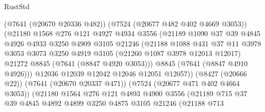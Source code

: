 \begin{lexlean}{RustStd}
\begin{coremodule}
{\begin{coremodule}
{{{{{{{{{{{{{{{{{{{{{{{{{{{{{{{{                            (@7641 (@20670 @20336 @482))
                            (@7524 (@20677 @482 @402 @4669 @3053))
                            (@21180
                              @1568
                              @276
                              @121
                              @4927
                              @4934
                              @3556
                              (@21189
                                @1090
                                @37
                                @39
                                @4845
                                @4926
                                @4933
                                @3250
                                @4909
                                @3105
                                @21246
                                (@21188
                                  @1088
                                  @431
                                  @37
                                  @11
                                  @3978
                                  @3053
                                  @3073
                                  @3250
                                  @4919
                                  @3105
                                  (@21260 @1087 @3978 @12013 @12017)
                                  @21272
                                  @8845
                                  (@7641 (@8847 @4920 @3053)))
                                @8845
                                (@7641 (@8847 @4910 @4926)))
                              @12036
                              @12039
                              @12042
                              @12046
                              @12051
                              @12057))
                          (@8427 (@20666 @22))
                          (@7641 (@20670 @20337 @471))
                          (@7524 (@20677 @471 @402 @4664 @3053))
                          (@21180
                            @1564
                            @276
                            @121
                            @4893
                            @4900
                            @3556
                            (@21189
                              @715
                              @37
                              @39
                              @4845
                              @4892
                              @4899
                              @3250
                              @4875
                              @3105
                              @21246
                              (@21188
                                @713
}}}}}}}}}}}}}}}}}}}}}}}}}}}}}}}}
\end{coremodule}}
\end{coremodule}
\end{lexlean}
